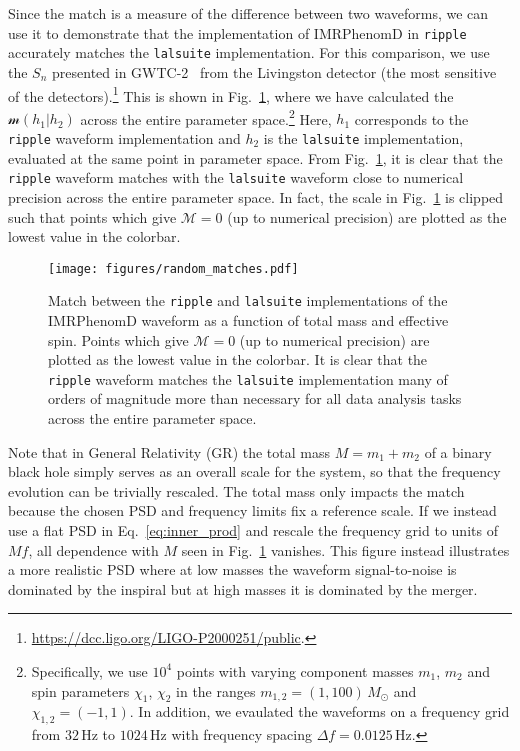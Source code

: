 \documentclass[twocolumn]{aastex631}
\newcommand{\ripple}{\texttt{ripple}\xspace}
\newcommand{\lalsuite}{\texttt{lalsuite}\xspace}
\begin{document}
Since the match is a measure of the difference between two waveforms, we can use it to demonstrate that the implementation of IMRPhenomD in \ripple accurately matches the \lalsuite implementation. For this comparison, we use the $S_n$  presented in GWTC-2~\citep{LIGOScientific:2020ibl} from the Livingston detector (the most sensitive of the detectors).\footnote{
    \url{https://dcc.ligo.org/LIGO-P2000251/public}.
    }
This is shown in Fig.~\ref{fig:match}, where we have calculated the $\mathcal{m}(h_1|h_2)$ across the entire parameter space.\footnote{
    Specifically, we use $10^4$ points with varying component masses $m_1$, $m_2$ and spin parameters $\chi_1$, $\chi_2$ in the ranges $m_{1,2} = (1,100)\,M_{\odot}$ and $\chi_{1,2} = (-1,1)$. In addition, we evaulated the waveforms on a frequency grid from $32\,$Hz to $1024\,$Hz with frequency spacing $\Delta f = 0.0125 \,$Hz.
}
Here, $h_1$ corresponds to the \ripple waveform implementation and $h_2$ is the \lalsuite implementation, evaluated at the same point in parameter space.
From Fig.~\ref{fig:match}, it is clear that the \ripple waveform matches with the \lalsuite waveform close to numerical precision across the entire parameter space.
In fact, the scale in Fig.~\ref{fig:match} is clipped such that points which give $\mathcal{M}=0$ (up to numerical precision) are plotted as the lowest value in the colorbar.

\begin{figure}[t]
    \begin{centering}
        \texttt{[image: figures/random\_matches.pdf]}
        \caption{
            Match between the \ripple and \lalsuite implementations of the IMRPhenomD waveform as a function of total mass and effective spin. 
            Points which give $\mathcal{M}=0$ (up to numerical precision) are plotted as the lowest value in the colorbar.
            It is clear that the \ripple waveform matches the \lalsuite implementation many of orders of magnitude more than necessary for all data analysis tasks across the entire parameter space.
        }
        \label{fig:match}
    \end{centering}
\end{figure}

Note that in General Relativity (GR) the total mass $M = m_1 + m_2$ of a binary black hole simply serves as an overall scale for the system, so that the frequency evolution can be trivially rescaled.
The total mass only impacts the match because the chosen PSD and frequency limits fix a reference scale.
If we instead use a flat PSD in Eq.~\eqref{eq:inner_prod} and rescale the frequency grid to units of $Mf$, all dependence with $M$ seen in Fig.~\ref{fig:match} vanishes. 
This figure instead illustrates a more realistic PSD where at low masses the waveform signal-to-noise is dominated by the inspiral but at high masses it is dominated by the merger.
\end{document}
